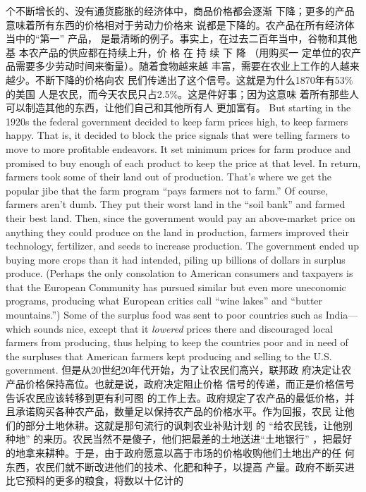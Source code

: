 \begin{paracol}{2}
个不断增长的、没有通货膨胀的经济体中，商品价格都会逐渐
下降；更多的产品意味着所有东西的价格相对于劳动力价格来
说都是下降的。农产品在所有经济体当中的“第一” 产品，
是最清晰的例子。事实上，在过去二百年当中，谷物和其他基
本农产品的供应都在持续上升，价 格 在 持 续 下 降 （用购买一
定单位的农产品需要多少劳动时间来衡量）。随着食物越来越
丰富，需要在农业上工作的人越来越少。不断下降的价格向农
民们传递出了这个信号。这就是为什么1870年有53\% 的美国
人是农民，而今天农民只占2.5\%。这是件好事；因为这意味
着所有那些人可以制造其他的东西，让他们自己和其他所有人
更加富有。
\switchcolumn*
But starting in the 1920s the federal government decided to
keep farm prices high, to keep farmers happy. That is, it decided
to block the price signals that were telling farmers to move to
more profitable endeavors. It set minimum prices for farm produce and promised to buy enough of each product to keep the
price at that level. In return, farmers took some of their land
out of production. That's where we get the popular jibe that the
farm program ``pays farmers not to farm.'' Of course, farmers
aren't dumb. They put their worst land in the ``soil bank'' and
farmed their best land. Then, since the government would pay
an above-market price on anything they could produce on the
land in production, farmers improved their technology, fertilizer, and seeds to increase production. The government ended
up buying more crops than it had intended, piling up billions of
dollars in surplus produce. (Perhaps the only consolation to
American consumers and taxpayers is that the European Community has pursued similar but even more uneconomic programs, producing what European critics call ``wine lakes'' and
``butter mountains.'') Some of the surplus food was sent to poor
countries such as India---which sounds nice, except that it \textit{lowered} prices there and discouraged local farmers from producing,
thus helping to keep the countries poor and in need of the surpluses that American farmers kept producing and selling to the
U.S. government.
\switchcolumn
但是从20世纪20年代开始，为了让农民们高兴，联邦政
府决定让农产品价格保持高位。也就是说，政府决定阻止价格
信号的传递，而正是价格信号告诉农民应该转移到更有利可图
的工作上去。政府规定了农产品的最低价格，并且承诺购买各种农产品，数量足以保持农产品的价格水平。作为回报，农民
让他们的部分土地休耕。这就是那句流行的讽刺农业补贴计划
的 “给农民钱，让他别种地” 的来历。农民当然不是傻子，他们把最差的土地送进“土地银行” ，把最好的地拿来耕种。于是，由于政府愿意以高于市场的价格收购他们土地出产的任
何东西，农民们就不断改进他们的技术、化肥和种子，以提高
产量。政府不断买进比它预料的更多的粮食，将数以十亿计的

\end{paracol}

